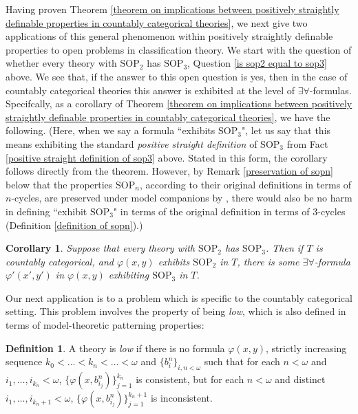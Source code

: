 \documentclass{article}
\newtheorem{corollary}{Corollary}
\theoremstyle{definition}
\newtheorem{definition}{Definition}
\theoremstyle{definition}
\theoremstyle{definition}
\begin{document}
Having proven Theorem \ref{theorem on implications between positively straightly definable properties in countably categorical theories}, we next give two applications of this general phenomenon within positively straightly definable properties to open problems in classification theory. We start with the question of whether every theory with $\mathrm{SOP}_{2}$  has $\mathrm{SOP}_{3}$, Question \ref{is sop2 equal to sop3} above. We see that, if the answer to this open question is yes, then in the case of countably categorical theories this answer is exhibited at the level of $\exists\forall$-formulas. Specifcally, as a corollary of Theorem \ref{theorem on implications between positively straightly definable properties in countably categorical theories}, we have the following. (Here, when we say a formula ``exhibits $\mathrm{SOP}_{3}$", let us say that this means exhibiting the standard \textit{positive straight definition} of $\mathrm{SOP}_{3}$ from Fact \ref{positive straight definition of sop3} above. Stated in this form, the corollary follows directly from the theorem. However, by Remark \ref{preservation of sopn} below that the properties $\mathrm{SOP}_{n}$, according to their original definitions in terms of $n$-cycles, are preserved under model companions by \cite{bodirsky2025taking}, there would also be no harm in defining ``exhibit $\mathrm{SOP}_{3}$" in terms of the original definition in terms of $3$-cycles (Definition \ref{definition of sopn}).)



\begin{corollary}
Suppose that every theory with $\mathrm{SOP}_{2}$  has $\mathrm{SOP}_{3}$. Then if $T$ is countably categorical, and $\varphi(x, y)$ exhibits $\mathrm{SOP}_{2}$ in $T$, there is some $\exists\forall$-formula $\varphi'(x', y')$ in $\varphi(x, y)$ exhibiting $\mathrm{SOP}_{3}$ in $T$.
\end{corollary}

Our next application is to a problem which is specific to the countably categorical setting. This problem involves the property of being \textit{low}, which is also defined in terms of model-theoretic patterning properties:

\begin{definition}
A theory is \textit{low} if there is no formula $\varphi(x, y)$, strictly increasing sequence $k_{0} < \ldots < k_{n} < \ldots < \omega$ and $\{b^{n}_{i}\}_{i, n < \omega}$ such that for each $n< \omega$ and $i_{1}, \ldots, i_{k_{n}} < \omega$, $\{\varphi(x, b^{n}_{i_{j}})\}^{k_{n}}_{j =1}$ is consistent, but for each $n< \omega$ and distinct $i_{1}, \ldots, i_{k_{n}+1} < \omega$, $\{\varphi(x, b^{n}_{i_{j}})\}^{k_{n}+1}_{j =1}$ is inconsistent.
\end{definition}
\end{document}

